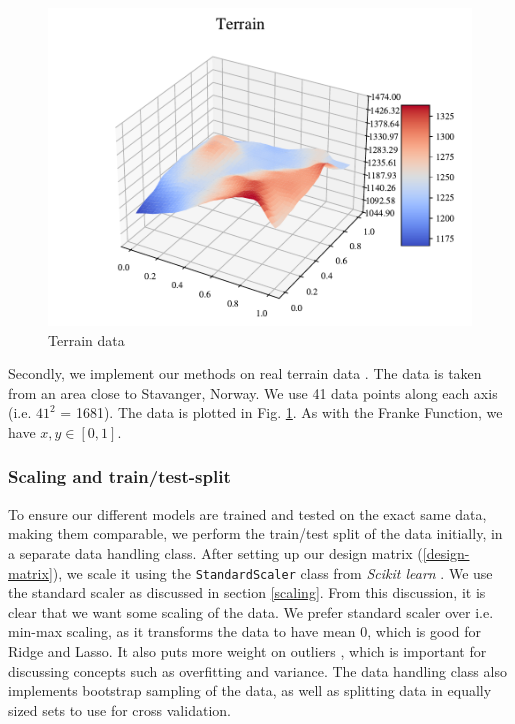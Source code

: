 \begin{figure}
    \centering
    \includegraphics[width=1\linewidth]{project_1/figures/figures_in_report/terrain.pdf}
    \caption{Terrain data}
    \label{data:terrain}
\end{figure}

Secondly, we implement our methods on real terrain data \cite{mortengithub}. The data is taken from an area close to Stavanger, Norway. We use 41 data points along each axis (i.e. $41^2$ = 1681). The data is plotted in Fig. \ref{data:terrain}. As with the Franke Function, we have $x,y \in [0,1]$.

\subsubsection{Scaling and train/test-split}
To ensure our different models are trained and tested on the exact same data, making them comparable, we perform the train/test split of the data initially, in a separate data handling class.
After setting up our design matrix (\ref{design-matrix}), we scale it using the \texttt{StandardScaler} class from \textit{Scikit learn} \cite{sklearn}. 
We use the standard scaler as discussed in section \ref{scaling}. 
From this discussion, it is clear that we want some scaling of the data. 
We prefer standard scaler over i.e. min-max scaling, as it transforms the data to have mean 0, which is good for Ridge and Lasso.
It also puts more weight on outliers \citep[p. 120]{raschka}, which is important for discussing concepts such as overfitting and variance.
The data handling class also implements bootstrap sampling of the data, as well as splitting data in equally sized sets to use for cross validation.

